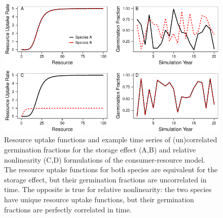\documentclass[12pt,]{article}
\begin{document}
\begin{figure}[htbp]
\centering
\includegraphics{components/figure/manuscript-model_types-1.pdf}
\caption{Resource uptake functions and example time series of
(un)correlated germination fractions for the storage effect (A,B) and
relative nonlinearity (C,D) formulations of the consumer-resource model.
The resource uptake functions for both species are equivalent for the
storage effect, but their germination fractions are uncorrelated in
time. The opposite is true for relative nonlinearity: the two species
have unique resource uptake functions, but their germination fractions
are perfectly correlated in time.}
\end{figure}

\newpage{}
\end{document}
